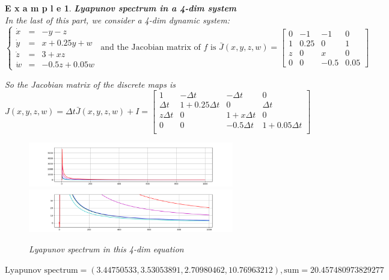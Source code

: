 \documentclass[12pt]{article}
\theoremstyle{plain}
\newtheorem{example}{\textbf{E x a m p l e}}[section]
\begin{document}
\begin{example}\textbf{Lyapunov spectrum in a 4-dim system}
\\\noindent In the last of this part, we consider a 4-dim dynamic system:
$$
\left\{\begin{array}{lll}
\dot x & = & -y-z \\
\dot y & = & x+0.25y+w \\
\dot z & = & 3+xz\\
\dot w & = & -0.5 z + 0.05w
\end{array}\right. \text{ and the Jacobian matrix of $f$ is } \bar J(x, y, z, w) = \left[\begin{array}{llll}
0   & -1    & -1    & 0     \\
1   & 0.25  & 0     & 1     \\
z   & 0     & x     & 0     \\
0   & 0     & -0.5  & 0.05
\end{array}\right]
$$

So the Jacobian matrix of the discrete maps is 
$$
J(x, y, z, w) = \Delta t\bar J(x, y, z, w) + I = \left[\begin{array}{llll}
1           & -\Delta t         & -\Delta t     & 0             \\
\Delta t    & 1 + 0.25\Delta t  & 0             & \Delta t      \\
z\Delta t   & 0                 & 1 + x\Delta t & 0             \\
0           & 0                 & -0.5 \Delta t & 1+0.05\Delta t\\
\end{array}\right]
$$
\begin{figure}[H]
\begin{center}
\includegraphics[width=0.8\textwidth]{figure/section5/Lya-spe-4-dim-full.png} \\
\includegraphics[width=0.8\textwidth]{figure/section5/Lya-spe-4-dim-partical.png} \\
\caption{Lyapunov spectrum in this 4-dim equation}
\end{center}
\end{figure}
$\text{Lyapunov spectrum} = (3.44750533, 3.53053891, 2.70980462, 10.76963212), \text{sum} = 20.457480973829277$
\end{example}
\end{document}
